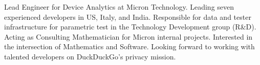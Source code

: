 

\begin{cvparagraph}

\vspace{1mm}Lead Engineer for Device Analytics at Micron Technology. Leading seven experienced developers in US, Italy, and India. Responsible for data and tester infrastructure for parametric test in the Technology Development group (R\&D). Acting as Consulting Mathematician for Micron internal projects. Interested in the intersection of Mathematics and Software. Looking forward to working with talented developers on DuckDuckGo's privacy mission.
\end{cvparagraph}
